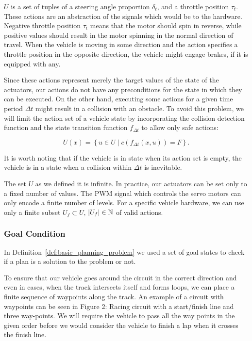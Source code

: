 $U$ is a set of tuples of a steering angle proportion $\delta_t$, and a throttle position $\tau_t$. These actions are an abstraction of the signals which would be to the hardware. Negative throttle position $\tau_t$ means that the motor should spin in reverse, while positive values should result in the motor spinning in the normal direction of travel. When the vehicle is moving in some direction and the action specifies a throttle position in the opposite direction, the vehicle might engage brakes, if it is equipped with any.

Since these actions represent merely the target values of the state of the actuators, our actions do not have any preconditions for the state in which they can be executed. On the other hand, executing some actions for a given time period $\Delta t$ might result in a collision with an obstacle. To avoid this problem, we will limit the action set of a vehicle state by incorporating the collision detection function and the state transition function $f_{\Delta t}$ to allow only safe actions:

\[
	U(x)=\left\{u\in U \mid c(f_{\Delta t}(x, u)) = F\right\}.
\]

It is worth noting that if the vehicle is in state when its action set is empty, the vehicle is in a state when a collision within $\Delta t$ is inevitable.

The set $U$ as we defined it is infinite. In practice, our actuators can be set only to a fixed number of values. The \gls*{PWM} signal which controls the servo motors can only encode a finite number of levels. For a specific vehicle hardware, we can use only a finite subset $U_f\subset U$, $\left|{U_f}\right|\in\mathbb{N}$ of valid actions.

\subsubsection{Goal Condition}

In Definition~\ref{def:basic_planning_problem} we used a set of goal states to check if a plan is a solution to the problem or not. 


To ensure that our vehicle goes around the circuit in the correct direction and even in cases, when the track intersects itself and forms loops, we can place a finite sequence of waypoints along the track. An example of a circuit with waypoints can be seen in Figure 2: Racing circuit with a start/finish line and three way-points. 
We will require the vehicle to pass all the way points in the given order before we would consider the vehicle to finish a lap when it crosses the finish line.

